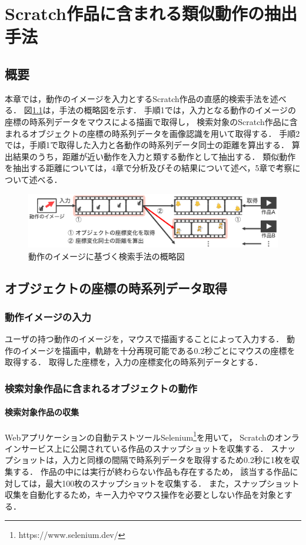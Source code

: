 \documentclass[11pt]{jreport}
\begin{document}
\chapter{Scratch作品に含まれる類似動作の抽出手法}

\section{概要}
本章では，動作のイメージを入力とするScratch作品の直感的検索手法を述べる．
図\ref{flow}は，手法の概略図を示す．
手順1では，入力となる動作のイメージの座標の時系列データをマウスによる描画で取得し，
検索対象のScratch作品に含まれるオブジェクトの座標の時系列データを画像認識を用いて取得する．
手順2では，手順1で取得した入力と各動作の時系列データ同士の距離を算出する．
算出結果のうち，距離が近い動作を入力と類する動作として抽出する．
類似動作を抽出する距離については，4章で分析及びその結果について述べ，5章で考察について述べる．

\begin{figure}[H]
    \centering
    \includegraphics[width=15cm]{flow.eps}
    \caption{動作のイメージに基づく検索手法の概略図}
    \label{flow}
\end{figure}

\section{オブジェクトの座標の時系列データ取得}

\subsection{動作イメージの入力}
ユーザの持つ動作のイメージを，マウスで描画することによって入力する．
動作のイメージを描画中，軌跡を十分再現可能である0.2秒ごとにマウスの座標を取得する．
取得した座標を，入力の座標変化の時系列データとする．

\subsection{検索対象作品に含まれるオブジェクトの動作}
\label{objectbehavior}

\subsubsection{検索対象作品の収集}
\label{collection}
Webアプリケーションの自動テストツールSelenium\footnote{https://www.selenium.dev/}を用いて，
Scratchのオンラインサービス上に公開されている作品のスナップショットを収集する．
スナップショットは，入力と同様の間隔で時系列データを取得するため0.2秒に1枚を収集する．
作品の中には実行が終わらない作品も存在するため，
該当する作品に対しては，最大100枚のスナップショットを収集する．
また，スナップショット収集を自動化するため，キー入力やマウス操作を必要としない作品を対象とする．
\end{document}
